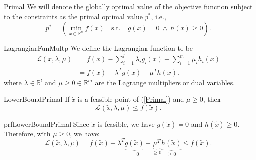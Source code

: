 \begin{theo}{Primal}
    We will denote the globally optimal value of the objective function subject to the constraints as the primal optimal value $p^*$, i\@.e\@., 
    \begin{equation*}
        p^* = \left( 
                \min_{x \in \mathbb{R}^n} f(x) \quad \text{s.t.} \quad g(x) = 0 \ \land \ h(x) \geq 0
            \right).
    \end{equation*}
    \vspace{-0.3cm}
\end{theo}

\begin{theo}{LagrangianFunMultp}
    We define the Lagrangian function to be 
    \begin{align*}
        \mathcal{L}(x, \lambda, \mu) 
            &= f(x) - \sum_{i=1}^l \lambda_i g_i(x) - \sum_{i=1}^m \mu_i h_i(x) \\
            &= f(x) - \lambda^T g(x) - \mu^T h(x).
    \end{align*}
    where $\lambda \in \mathbb{R}^l$ and $\mu \geq 0 \in \mathbb{R}^m$ are the Lagrange multipliers or dual variables.
\end{theo}


\begin{lem}{LowerBoundPrimal}
    If $\tilde{x}$ is a feasible point of (\ref{Primal}) and $\mu \geq 0$, then
    \begin{equation*}
        \mathcal{L}(\tilde{x}, \lambda, \mu) \leq f(\tilde{x}).
    \end{equation*}
    \vspace*{-0.5cm}
\end{lem}

\begin{prf}{prfLowerBoundPrimal}
    Since $\tilde{x}$ is feasible, we have $g(\tilde{x}) = 0$ and $h(\tilde{x}) \geq 0$. Therefore, with $\mu \geq 0$, we have:
    \begin{equation*}
        \mathcal{L}(\tilde{x}, \lambda, \mu) = f(\tilde{x}) + \lambda^T \underbrace{g(\tilde{x})}_{=0} + \underbrace{\mu^T}_{\geq 0} \underbrace{h(\tilde{x})}_{\geq 0} \leq f(\tilde{x}).
    \end{equation*}
    \vspace*{-0.6cm}
\end{prf}

